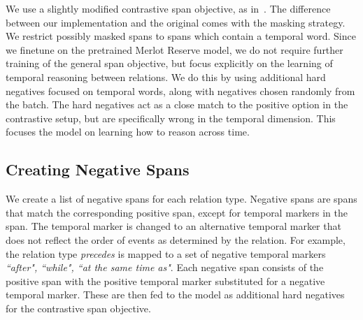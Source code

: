 We use a slightly modified contrastive span objective, as
in~\cite{zellers2022mreserve}. The difference between our implementation and
the original comes with the masking strategy. We restrict possibly masked spans
to spans which contain a temporal word. Since we finetune on the pretrained
Merlot Reserve model, we do not require further training of the general span
objective, but focus explicitly on the learning of temporal reasoning between
relations. We do this by using additional hard negatives focused on temporal
words, along with negatives chosen randomly from the batch.  The hard negatives
act as a close match to the positive option in the contrastive setup, but are
specifically wrong in the temporal dimension. This focuses the model on learning
how to reason across time.

\subsection{Creating Negative Spans}

We create a list of negative spans for each relation type. Negative spans are
spans that match the corresponding positive span, except for temporal markers
in the span. The temporal marker is changed to an alternative temporal marker
that does not reflect the order of events as determined by the relation. For
example, the relation type \textit{precedes} is mapped to a set of negative
temporal markers \textit{``after", ``while", ``at the same time as"}. Each
negative span consists of the positive span with the positive temporal marker
substituted for a negative temporal marker. These are then fed to the model
as additional hard negatives for the contrastive span objective.


